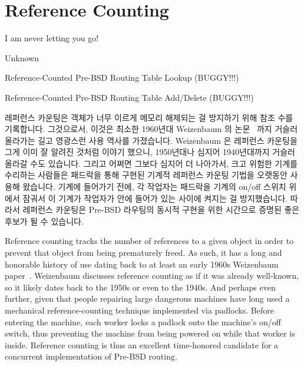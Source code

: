 
\section{Reference Counting}
\label{sec:defer:Reference Counting}
%
\epigraph{I am never letting you go!}{Unknown}

\begin{listing}[tbp]

\caption{Reference-Counted Pre-BSD Routing Table Lookup (BUGGY!!!)}
\label{lst:defer:Reference-Counted Pre-BSD Routing Table Lookup}
\end{listing}

\begin{listing}[tbp]

\caption{Reference-Counted Pre-BSD Routing Table Add\slash Delete (BUGGY!!!)}
\label{lst:defer:Reference-Counted Pre-BSD Routing Table Add/Delete}
\end{listing}

레퍼런스 카운팅은 객체가 너무 이르게 메모리 해제되는 걸 방지하기 위해 참조 수를
기록합니다.
그것으로서, 이것은 최소한 1960년대 Weizenbaum 의
논문~\cite{Weizenbaum:1963:SLP:367593.367617} 까지 거슬러 올라가는 길고
영광스런 사용 역사를 가졌습니다.
Weizenbaum 은 레퍼런스 카운팅을 그게 이미 잘 알려진 것처럼 이야기 했으니,
1950년대나 심지어 1940년대까지 거슬러 올라갈 수도 있습니다.
그리고 어쩌면 그보다 심지어 더 나아가서, 크고 위험한 기계를 수리하는 사람들은
패드락을 통해 구현된 기계적 레퍼런스 카운팅 기법을 오랫동안 사용해 왔습니다.
기계에 들어가기 전에, 각 작업자는 패드락을 기계의 on/off 스위치 위에서 잠궈서
이 기계가 작업자가 안에 들어가 있는 사이에 켜지는 걸 방지했습니다.
따라서 레퍼런스 카운팅은 Pre-BSD 라우팅의 동시적 구현을 위한 시간으로 증명된
좋은 후보가 될 수 있습니다.

\iffalse

Reference counting tracks the number of references to a given object in
order to prevent that object from being prematurely freed.
As such, it has a long and honorable history of use dating back to
at least an early 1960s Weizenbaum
paper~\cite{Weizenbaum:1963:SLP:367593.367617}.
Weizenbaum discusses reference counting as if it was already well-known,
so it likely dates back to the 1950s or even to the 1940s.
And perhaps even further, given that people repairing large dangerous
machines have long used a mechanical reference-counting technique
implemented via padlocks.
Before entering the machine, each worker locks a padlock onto the
machine's on/off switch, thus preventing the machine from being powered
on while that worker is inside.
Reference counting is thus an excellent time-honored candidate for a
concurrent implementation of Pre-BSD routing.

